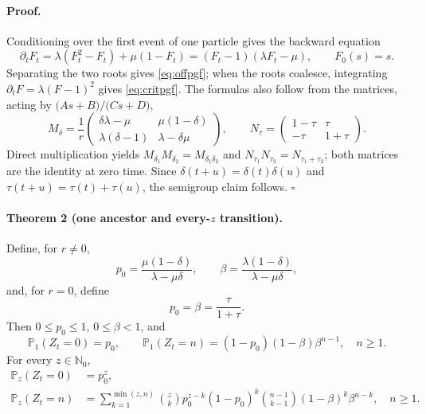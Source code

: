 \documentclass[9pt]{extarticle}
\newcommand{\Nzero}{\mathbb N_0}
\begin{document}
\paragraph{Proof.}
Conditioning over the first event of one particle gives the backward equation
\begin{equation}\label{eq:riccati}
 \partial_tF_t=\lambda(F_t^2-F_t)+\mu(1-F_t)
              =(F_t-1)(\lambda F_t-\mu),\qquad F_0(s)=s.
\end{equation}
Separating the two roots gives \eqref{eq:offpgf}; when the roots coalesce,
integrating $\partial_tF=\lambda(F-1)^2$ gives \eqref{eq:critpgf}.
The formulas also follow from the matrices, acting by
$\bigl(As+B\bigr)/\bigl(Cs+D\bigr)$,
\[
 M_\delta=\frac1r
 \begin{pmatrix}
 \delta\lambda-\mu&\mu(1-\delta)\\
 \lambda(\delta-1)&\lambda-\delta\mu
 \end{pmatrix},\qquad
 N_\tau=\begin{pmatrix}1-\tau&\tau\\-\tau&1+\tau\end{pmatrix}.
\]
Direct multiplication yields
$M_{\delta_1}M_{\delta_2}=M_{\delta_1\delta_2}$ and
$N_{\tau_1}N_{\tau_2}=N_{\tau_1+\tau_2}$; both matrices are the identity at
zero time.  Since $\delta(t+u)=\delta(t)\delta(u)$ and
$\tau(t+u)=\tau(t)+\tau(u)$, the semigroup claim follows. \hfill$\square$

\paragraph{Theorem 2 (one ancestor and every-$z$ transition).}
Define, for $r\ne0$,
\begin{equation}\label{eq:pb-off}
 p_0=\frac{\mu(1-\delta)}{\lambda-\mu\delta},\qquad
 \beta=\frac{\lambda(1-\delta)}{\lambda-\mu\delta},
\end{equation}
and, for $r=0$, define
\begin{equation}\label{eq:pb-critical}
 p_0=\beta=\frac{\tau}{1+\tau}.
\end{equation}
Then $0\leq p_0\leq1$, $0\leq\beta<1$, and
\begin{equation}\label{eq:one-law}
 \mathbb P_1(Z_t=0)=p_0,\qquad
 \mathbb P_1(Z_t=n)=(1-p_0)(1-\beta)\beta^{n-1},\quad n\geq1.
\end{equation}
For every $z\in\Nzero$,
\begin{align}
 \mathbb P_z(Z_t=0)&=p_0^z, \label{eq:z-zero}\\
 \mathbb P_z(Z_t=n)&=
 \sum_{k=1}^{\min(z,n)}\binom zk p_0^{z-k}(1-p_0)^k
 \binom{n-1}{k-1}(1-\beta)^k\beta^{n-k},\quad n\geq1. \label{eq:z-law}
\end{align}
\end{document}
